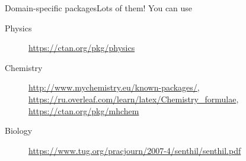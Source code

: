 \begin{frame}{Domain-specific packages}{Lots of them!}\relax
You can use 
    \begin{description}
        \item[Physics] \url{https://ctan.org/pkg/physics}
        \item[Chemistry] \url{http://www.mychemistry.eu/known-packages/}, \url{https://ru.overleaf.com/learn/latex/Chemistry_formulae}, \url{https://ctan.org/pkg/mhchem}
        \item[Biology] \url{https://www.tug.org/pracjourn/2007-4/senthil/senthil.pdf} 
    \end{description}
     
\end{frame}